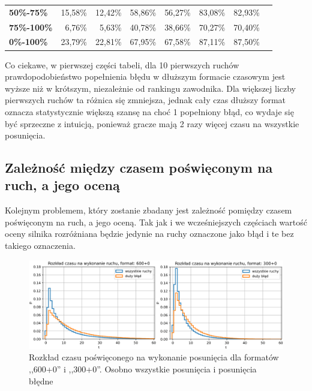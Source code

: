 \documentclass[inzynierska]{pwr_wmat_praca_dyplomowa}
\theoremstyle{plain}
\numberwithin{theorem}{chapter}
\theoremstyle{definition}
\numberwithin{theorem}{chapter}
\begin{document}
\begin{table}[H]
\begin{tabular}{|l|r|r|r|r|r|r|l}
		\textbf{50\%-75\%}                                                      & 15,58\%                             & 12,42\%                             & 58,86\%                             & 56,27\%                             & 83,08\%                             & 82,93\%                             &           \\ \cline{1-7}
		\textbf{75\%-100\%}                                                     & 6,76\%                              & 5,63\%                              & 40,78\%                             & 38,66\%                             & 70,27\%                             & 70,40\%                             &           \\ \cline{1-7}
		\textbf{0\%-100\%}                                                     & 23,79\%                              & 22,81\%                              & 67,95\%                             & 67,58\%                             & 87,11\%                             & 87,50\%                             &           \\ \cline{1-7}
	\end{tabular}
	\label{tab:blad_w_n_ruchach} 
\end{table}
 Co ciekawe, w pierwszej części tabeli, dla 10 pierwszych ruchów prawdopodobieństwo popełnienia błędu w dłuższym formacie czasowym jest wyższe niż w krótszym, niezależnie od rankingu zawodnika. Dla większej liczby pierwszych ruchów ta różnica się zmniejsza, jednak cały czas dłuższy format oznacza statystycznie większą szansę na choć 1 popełniony błąd, co wydaje się być sprzeczne z intuicją, ponieważ gracze mają 2 razy więcej czasu na wszystkie posunięcia.

\subsection{Zależność między czasem poświęconym na ruch, a jego oceną}


Kolejnym problemem, który zostanie zbadany jest zależność pomiędzy czasem poświęconym na ruch, a jego oceną. Tak jak i we wcześniejszych częściach wartość oceny silnika rozróżniana będzie jedynie na ruchy oznaczone jako błąd i te bez takiego oznaczenia.
\begin{figure}[H]
	\centering
	\includegraphics[width=\textwidth]{rozklad_czasu.png}
	\caption{Rozkład czasu poświęconego na wykonanie posunięcia dla formatów ,,600+0'' i ,,300+0''. Osobno wszystkie posunięcia i posunięcia błędne}
	\label{rys:rozklad_czasu}
\end{figure}
\end{document}
